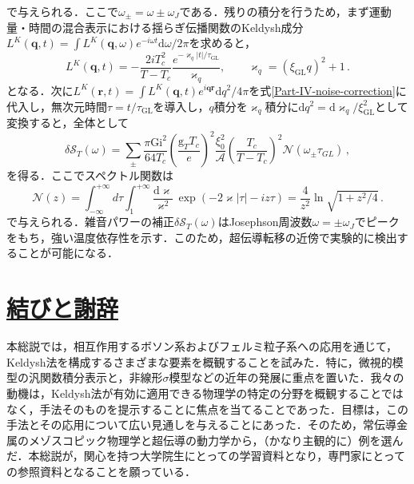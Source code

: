 \documentclass[a4paper,11pt]{ltjsarticle}
\newcommand{\sectionlink}[1]{\section[#1]{\hyperlink{toc}{#1}}}
\def\d{\mathrm{d}}
\begin{document}
で与えられる．ここで$\omega_{\pm}=\omega\pm\omega_{J}$である．残りの積分を行うため，まず運動量・時間の混合表示における揺らぎ伝播関数のKeldysh成分$L^{K}(\mathbf{q},t)=\int L^{K}(\mathbf{q},\omega)e^{-i\omega t}\d\omega/2\pi$を求めると，
\begin{equation}
L^{K}(\mathbf{q},t)=-\frac{2iT^{2}_{c}}{T-T_{c}}
\frac{e^{-\varkappa_{q}|t|/\tau_{\mathrm{GL}}}}{\varkappa_{q}},\quad\quad
\varkappa_{q}=(\xi_{\mathrm{GL}}q)^{2}+1\,.
\end{equation}
となる．次に$L^{K}(\mathbf{r},t)=\int L^{K}(\mathbf{q},t)e^{i\mathbf{qr}}\d q^{2}/4\pi$を式\eqref{Part-IV-noise-correction}に代入し，無次元時間$\tau=t/\tau_{\mathrm{GL}}$を導入し，$q$積分を$\varkappa_q$積分に$\d q^{2}=\d\varkappa_q/\xi^{2}_{\mathrm{GL}}$として変換すると，全体として\cite{Levchenko-J-Noise}
\begin{equation}
\delta\mathcal{S}_{T}(\omega)=\sum_{\pm}\frac{\pi
\mathrm{Gi}^{2}}{64
T_c}\left(\frac{\mathrm{g}_{T}T_c}{e}\right)^{2}\frac{\xi^{2}_{0}}{\mathcal{A}}
\left(\frac{T_{c}}{T-T_{c}}\right)^{2}\mathcal{N}(\omega_{\pm}\tau_{GL})\,,
\end{equation}
を得る．ここでスペクトル関数は
\begin{equation}
\mathcal{N}(z)=\int^{+\infty}_{-\infty}d\tau\int^{+\infty}_{1}
\frac{\d\varkappa}{\varkappa^{2}}\, \exp(-2\varkappa|\tau|-iz
\tau)=\frac{4}{z^{2}}\ln\sqrt{1+z^{2}/4}\,.
\end{equation}
で与えられる．雑音パワーの補正$\delta\mathcal{S}_{T}(\omega)$はJosephson周波数$\omega=\pm\omega_{J}$でピークをもち，強い温度依存性を示す．このため，超伝導転移の近傍で実験的に検出することが可能になる．



\sectionlink{結びと謝辞}\label{sec_Summary}

本総説では，相互作用するボソン系およびフェルミ粒子系への応用を通じて，Keldysh法を構成するさまざまな要素を概観することを試みた．特に，微視的模型の汎関数積分表示と，非線形$\sigma$模型などの近年の発展に重点を置いた．我々の動機は，Keldysh法が有効に適用できる物理学の特定の分野を概観することではなく，手法そのものを提示することに焦点を当てることであった．目標は，この手法とその応用について広い見通しを与えることにあった．そのため，常伝導金属のメゾスコピック物理学と超伝導の動力学から，（かなり主観的に）例を選んだ．本総説が，関心を持つ大学院生にとっての学習資料となり，専門家にとっての参照資料となることを願っている．
\end{document}
